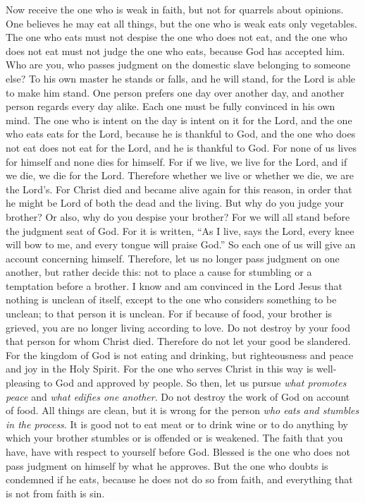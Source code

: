 \begin{biblechapter} %
 Now receive the one who is weak in faith, but not for quarrels about opinions.
\verse One believes he may eat all things, but the one who is weak eats only vegetables.
\verse The one who eats must not despise the one who does not eat, and the one who does not eat must not judge the one who eats, because God has accepted him.
\verse Who are you, who passes judgment on the domestic slave belonging to someone else? To his own master he stands or falls, and he will stand, for the Lord is able to make him stand.
\verse One person prefers one day over another day, and another person regards every day alike. Each one must be fully convinced in his own mind.
\verse The one who is intent on the day is intent on it for the Lord, and the one who eats eats for the Lord, because he is thankful to God, and the one who does not eat does not eat for the Lord, and he is thankful to God.
\verse For none of us lives for himself and none dies for himself.
\verse For if we live, we live for the Lord, and if we die, we die for the Lord. Therefore whether we live or whether we die, we are the Lord’s.
\verse For Christ died and became alive again for this reason, in order that he might be Lord of both the dead and the living.
\verse But why do you judge your brother? Or also, why do you despise your brother? For we will all stand before the judgment seat of God.
\verse For it is written, “As I live, says the Lord, every knee will bow to me, 
and every tongue will praise God.”
\verse So each one of us will give an account concerning himself.
\verse Therefore, let us no longer pass judgment on one another, but rather decide this: not to place a cause for stumbling or a temptation before a brother.
\verse I know and am convinced in the Lord Jesus that nothing is unclean of itself, except to the one who considers something to be unclean; to that person it is unclean.
\verse For if because of food, your brother is grieved, you are no longer living according to love. Do not destroy by your food that person for whom Christ died.
\verse Therefore do not let your good be slandered.
\verse For the kingdom of God is not eating and drinking, but righteousness and peace and joy in the Holy Spirit.
\verse For the one who serves Christ in this way is well-pleasing to God and approved by people.
\verse So then, let us pursue \textit{what promotes peace} and \textit{what edifies one another}.
\verse Do not destroy the work of God on account of food. All things are clean, but it is wrong for the person \textit{who eats and stumbles in the process}.
\verse It is good not to eat meat or to drink wine or to do anything by which your brother stumbles or is offended or is weakened.
\verse The faith that you have, have with respect to yourself before God. Blessed is the one who does not pass judgment on himself by what he approves.
\verse But the one who doubts is condemned if he eats, because he does not do so from faith, and everything that is not from faith is sin.
\end{biblechapter}

